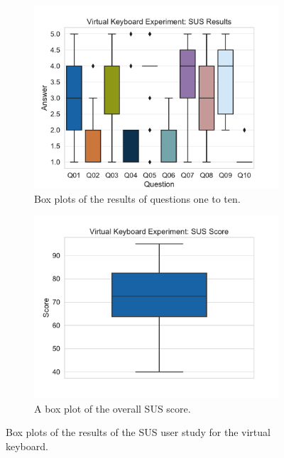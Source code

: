 \begin{figure}[H]
	\centering
	\begin{subfigure}[t]{.5\linewidth}%
		\centering
		\includegraphics[width=\linewidth]{figures/evaluation/res_exp_vk.pdf}
		\caption{Box plots of the results of questions one to ten.}\label{fig:res-exp-vk}
	\end{subfigure}%
	\begin{subfigure}[t]{.5\linewidth}%
		\centering
		\includegraphics[width=\linewidth]{figures/evaluation/score_exp_vk.pdf}
		\caption{A box plot of the overall \gls{SUS} score.}\label{fig:score-exp-vk}
	\end{subfigure}%
	\caption[Virtual keyboard SUS results]{Box plots of the results of the \gls{SUS} user study for the virtual keyboard.}\label{fig:exp-vk-stats}
\end{figure}

